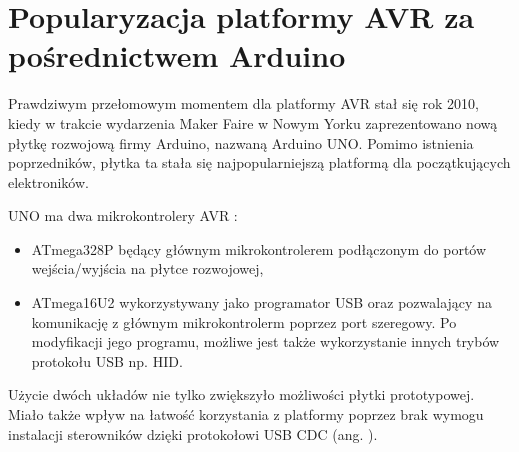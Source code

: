 \section{Popularyzacja platformy AVR za pośrednictwem Arduino}

Prawdziwym przełomowym momentem dla platformy AVR stał się rok 2010, kiedy w trakcie wydarzenia Maker Faire w Nowym Yorku zaprezentowano nową płytkę rozwojową firmy Arduino, nazwaną Arduino UNO. Pomimo istnienia poprzedników, płytka ta stała się najpopularniejszą platformą dla początkujących elektroników. 

UNO ma dwa mikrokontrolery AVR :
\begin{itemize}
\item ATmega328P będący głównym mikrokontrolerem podłączonym do portów wejścia/wyjścia na płytce rozwojowej,
\item ATmega16U2 wykorzystywany jako programator USB oraz pozwalający na komunikację z głównym mikrokontrolerm poprzez port szeregowy. Po modyfikacji jego programu, możliwe jest także wykorzystanie innych trybów protokołu USB np. HID.
\end{itemize}
Użycie dwóch układów nie tylko zwiększyło możliwości płytki prototypowej. Miało także wpływ na łatwość korzystania z platformy poprzez brak wymogu instalacji sterowników dzięki protokołowi USB CDC (ang. ).


